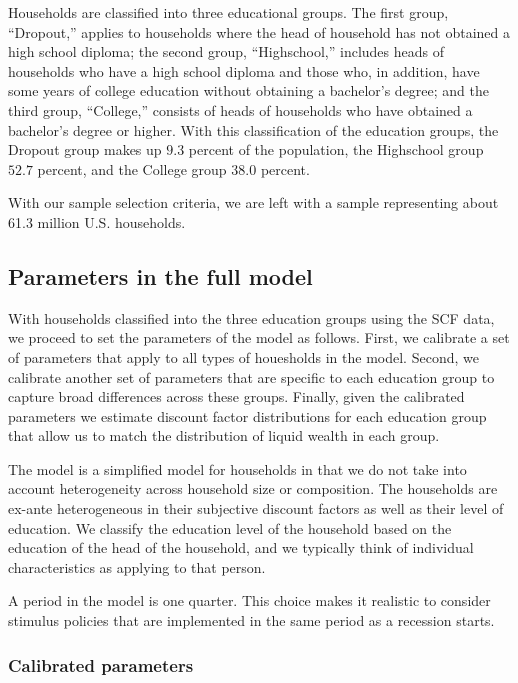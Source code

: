 \documentclass[\econtexRoot/HAFiscal]{subfiles}
\begin{document}
Households are classified into three educational groups. The first group, ``Dropout,'' applies to households where the head of household has not obtained a high school diploma; the second group, ``Highschool,'' includes heads of households who have a high school diploma and those who, in addition, have some years of college education without obtaining a bachelor's degree; and the third group, ``College,'' consists of heads of households who have obtained a bachelor's degree or higher. With this classification of the education groups, the Dropout group makes up $9.3$ percent of the population, the Highschool group $52.7$ percent, and the College group $38.0$ percent. 

With our sample selection criteria, we are left with a sample representing about 61.3 million U.S. households.

\subsection{Parameters in the full model}
\notinsubfile{\label{sec:paramsFull}}

With households classified into the three education groups using the SCF data, we proceed to set the parameters of the model as follows. First, we calibrate a set of parameters that apply to all types of houesholds in the model. Second, we calibrate another set of parameters that are specific to each education group to capture broad differences across these groups. Finally, given the calibrated parameters we estimate discount factor distributions for each education group that allow us to match the distribution of liquid wealth in each group. 

The model is a simplified model for households in that we do not take into account heterogeneity across household size or composition. The households are ex-ante heterogeneous in their subjective discount factors as well as their level of education. We classify the education level of the household based on the education of the head of the household, and we typically think of individual characteristics as applying to that person. 

A period in the model is one quarter. This choice makes it realistic to consider stimulus policies that are implemented in the same period as a recession starts. 

\subsubsection{Calibrated parameters} 
\notinsubfile{\label{sec:calib}}
\end{document}
